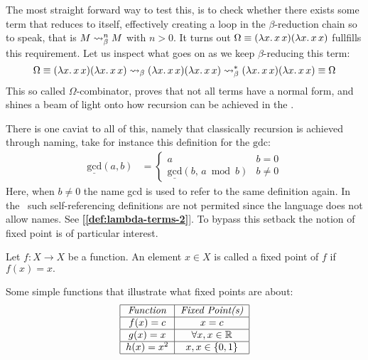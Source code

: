 \documentclass[12pt]{book}
\newcommand{\myref}[1]{\textcolor{refcolor}{\textbf{[\hyperref[#1]{\ref*{#1}}}]}}
\begin{document}
The most straight forward way to test this, is to check whether there exists some term that reduces to itself, effectively creating a loop in the $\beta$-reduction chain so to speak, that is \( M \mathrel{\leadsto}_\beta^n M \) with $ n > 0 $. It turns out \( \Omega \equiv (\lambda x . \, x \, x) (\lambda x . \, x \, x) \) fullfills this requirement. Let us inspect what goes on as we keep $\beta$-reducing this term:
\[
  \Omega \equiv (\lambda x . \, x \, x) (\lambda x . \, x \, x) \mathrel{\leadsto}_\beta (\lambda x . \, x \, x) (\lambda x . \, x \, x) \mathrel{\leadsto}_\beta^* (\lambda x . \, x \, x) (\lambda x . \, x \, x) \equiv \Omega
\]
This so called $\Omega$-combinator, proves that not all terms have a normal form, and shines a beam of light onto how recursion can be achieved in the \lcalc.

There is one caviat to all of this, namely that classically recursion is achieved through naming, take for instance this definition for the $\mathrm{gdc}$:
\begin{align*}
  \underline{\mathrm{gcd}}(a,b) &= 
                      \begin{cases}
                        a & b = 0 \\
                        \underline{\mathrm{gcd}}(b,\, a \bmod b) & b \neq 0
                      \end{cases}
\end{align*}
Here, when $b \neq 0$ the name gcd is used to refer to the same definition again. In the \lcalc \ such self-referencing definitions are not permited since the language does not allow names. See \myref{def:lambda-terms-2}. To bypass this setback the notion of fixed point is of particular interest.
\begin{definition}
  Let \( f : X \to X \) be a function. An element \( x \in X \) is called a fixed point of \( f \) if \( f(x) = x. \)
\end{definition}
\begin{example} Some simple functions that illustrate what fixed points are about:
  \[
    \begin{tabular}{|c|c|}
      \hline
      \textit{Function} & \textit{Fixed Point(s)} \\
      \hline
      $f(x) = c$ & $x = c$ \\
      \hline
      $g(x) = x$ & $\forall x, x \in \mathbb{R}$ \\
      \hline
      $h(x) = x^2$ & $ x, x \in \{0, 1\} $ \\
      \hline
    \end{tabular}
  \]
\end{example}
\end{document}
